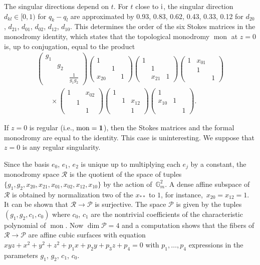 \documentclass[pdftex]{sigma}
\numberwithin{equation}{section}
\begin{document}
The singular directions depend on $t$. For $t$ close to ${\rm i}$, the singular direction $d_{kl} \in [0,1)$ for $ q_k-q_l$ are approximated
by 0.93, 0.83, 0.62, 0.43, 0.33, 0.12 for $d_{20}$, $d_{21}$, $ d_{01}$, $d_{02}$, $d_{12}$, $d_{10}$.
This determines the order of the six Stokes matrices in the monodromy identity, which states that the topological monodromy $\operatorname{mon}$ at
$z=0$ is, up to conjugation, equal to the product
\begin{gather*}
\begin{pmatrix} g_1& & \\ &g_2 & \\ & &\frac{1}{g_1g_2} \end{pmatrix}
\begin{pmatrix} 1& & \\ &1 & \\ x_{20}& &1 \end{pmatrix}
\begin{pmatrix} 1 & & \\ &1 & \\ &x_{21} & 1 \end{pmatrix}
\begin{pmatrix} 1& x_{01}& \\ &1 & \\ & &1 \end{pmatrix} \\
\qquad\times\begin{pmatrix} 1 & & x_{02}\\ &1 & \\ & & 1 \end{pmatrix}
\begin{pmatrix} 1& & \\ &1 & x_{12}\\ & & 1 \end{pmatrix}
\begin{pmatrix} 1& & \\ x_{10}&1 & \\ & & 1 \end{pmatrix}. \end{gather*}


 If $z=0$ is regular (i.e., $\operatorname{mon}={\bf 1}$), then the Stokes matrices and the formal monodromy are equal to the identity. This case is uninteresting. We suppose that $z=0$ is any regular singularity.

Since the basis $e_0$, $e_1$, $e_2$ is unique up to multiplying each $e_j$ by a constant, the monodromy space
$\mathcal{R}$ is the quotient of the space of tuples
$\{g_1,g_2,x_{20}, x_{21},x_{01}, x_{02}, x_{12},x_{10}\}$ by the action of~$\mathbb{G}_m^2$. A dense affine
subspace of $\mathcal{R}$ is obtained by normalization two of the $x_{**}$ to $1$, for instance,~${x_{20}=x_{12}=1}$.
It can be shown that $\mathcal{R}\rightarrow \mathcal{P}$ is surjective. The space $\mathcal{P}$ is given by the
tuples $(g_1,g_2, c_1,c_0)$ where $c_0$, $c_1$ are the nontrivial coefficients of the characteristic polynomial of $\operatorname{mon}$.
Now $\dim \mathcal{P}=4$ and a computation shows that the fibers of $\mathcal{R}\rightarrow \mathcal{P}$ are
affine cubic surfaces with equation $xyz+x^2+y^2+z^2+p_1x+p_2y+p_3z+p_4=0$ with $p_1,\dots ,p_4$ expressions in the
parameters $g_1$, $g_2$, $c_1$, $c_0$.
\end{document}
